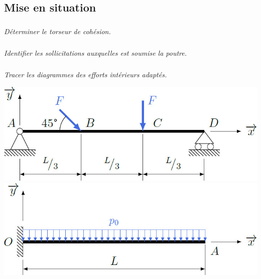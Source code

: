 \documentclass[10pt,fleqn]{article} %
\begin{document}

\vspace{5.5cm}
\pagestyle{fancy}
\thispagestyle{plain}


\def\columnseprulecolor{\color{ocre}}
\setlength{\columnseprule}{0.4pt} 

\begin{multicols}{2}
\section*{Mise en situation}
\ifprof
\else
\fi




\subparagraph{}\textit{Déterminer le torseur de cohésion.}
\subparagraph{}\textit{Identifier les sollicitations auxquelles est soumise la poutre.}
\subparagraph{}\textit{Tracer les diagrammes des efforts intérieurs adaptés.}

\begin{center}
\includegraphics[width=\linewidth]{images/fig_01}
\hspace{1cm}
\includegraphics[width=\linewidth]{images/fig_02}
\end{center}


\end{multicols}

\newpage
\end{document}
